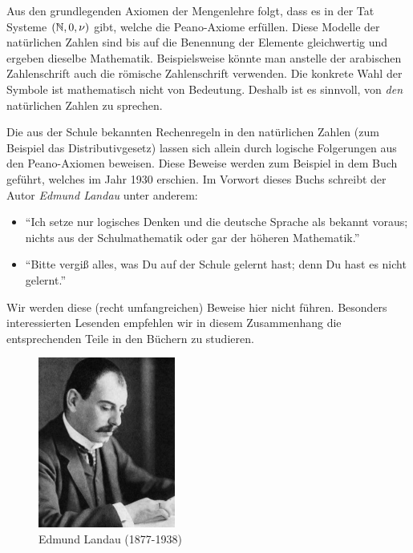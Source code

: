 \bemerkungen{-}{}
{Aus den grundlegenden Axiomen der Mengenlehre folgt, dass es in der Tat Systeme $(\mathbb{N},0,\nu)$ gibt, welche die Peano-Axiome erfüllen. Diese Modelle der natürlichen Zahlen sind bis auf die Benennung der Elemente gleichwertig und ergeben dieselbe Mathematik. Beispielsweise könnte man anstelle der arabischen Zahlenschrift auch die römische Zahlenschrift verwenden. Die konkrete Wahl der Symbole ist mathematisch nicht von Bedeutung. Deshalb ist es sinnvoll, von \textit{den} natürlichen Zahlen zu sprechen.}
{Die aus der Schule bekannten Rechenregeln in den natürlichen Zahlen (zum Beispiel das Distributivgesetz) lassen sich allein durch logische Folgerungen aus den Peano-Axiomen beweisen. Diese Beweise werden zum Beispiel in dem Buch \cite{Landau} geführt, welches im Jahr 1930 erschien. Im Vorwort dieses Buchs schreibt der Autor \textit{Edmund Landau} unter anderem:
\begin{itemize}
    \item \enquote{Ich setze nur logisches Denken und die deutsche Sprache als bekannt voraus; nichts aus der Schulmathematik oder gar der höheren Mathematik.}
    \item \enquote{Bitte vergiß alles, was Du auf der Schule gelernt hast; denn Du hast es nicht gelernt.}
\end{itemize}
Wir werden diese (recht umfangreichen) Beweise hier nicht führen. Besonders interessierten Lesenden empfehlen wir in diesem Zusammenhang die entsprechenden Teile in den Büchern \cite{Landau,TerenceTao,AmannEscher1} zu studieren.}

\begin{figure}[H]
    \centering
    \includegraphics[width=0.4\textwidth]{Landau.jpg}
    \caption{Edmund Landau (1877-1938)}
    \label{fig:Landau}
\end{figure}

\clearpage
\shipoutAnswer